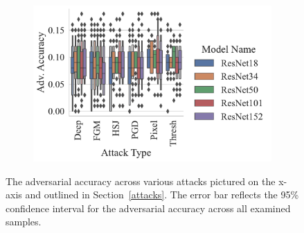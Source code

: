 \begin{figure}[h!]
\begin{subfigure}[]{0.27\textwidth}
\end{subfigure}
\begin{subfigure}[]{0.36\textwidth}
    \centering
    \includegraphics[width=\textwidth]{mnist/adv_accuracy_vs_attack_type.pdf}
\end{subfigure}
\caption{The adversarial accuracy across various attacks pictured on the x-axis and outlined in Section~\ref{attacks}. The error bar reflects the 95\% confidence interval for the adversarial accuracy across all examined samples.}
\label{fig:mnist_accuracies}
\end{figure}

